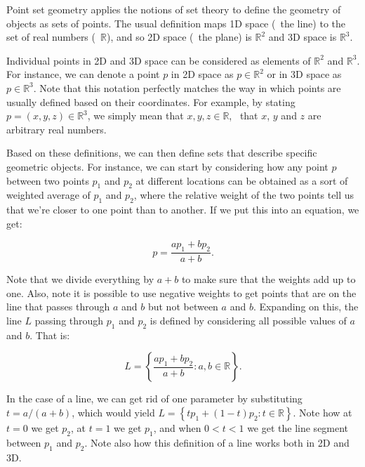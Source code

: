 Point set geometry applies the notions of set theory to define the geometry of objects as sets of points.
The usual definition maps 1D space (\ie\ the line) to the set of real numbers (\ie\ \(\mathbb{R}\)), and so 2D space (\ie\ the plane) is \(\mathbb{R}^2\) and 3D space is \(\mathbb{R}^3\).

Individual points in 2D and 3D space can be considered as elements of \(\mathbb{R}^2\) and \(\mathbb{R}^3\).
For instance, we can denote a point \(p\) in 2D space as \(p \in \mathbb{R}^2\) or in 3D space as \(p \in \mathbb{R}^3\).
Note that this notation perfectly matches the way in which points are usually defined based on their coordinates.
For example, by stating \(p = (x, y, z) \in \mathbb{R}^3\), we simply mean that \(x,y,z \in \mathbb{R} \), \ie\ that \(x\), \(y\) and \(z\) are arbitrary real numbers.

Based on these definitions, we can then define sets that describe specific geometric objects.
For instance, we can start by considering how any point \(p\) between two points \(p_1\) and \(p_2\) at different locations can be obtained as a sort of weighted average of \(p_1\) and \(p_2\), where the relative weight of the two points tell us that we're closer to one point than to another.
If we put this into an equation, we get:

\begin{equation}
p = \frac{a p_1 + b p_2}{a+b}.
\end{equation}

Note that we divide everything by \(a+b\) to make sure that the weights add up to one.
Also, note it is possible to use negative weights to get points that are on the line that passes through \(a\) and \(b\) but not between \(a\) and \(b\).
Expanding on this, the line \(L\) passing through \(p_1\) and \(p_2\) is defined by considering all possible values of \(a\) and \(b\).
That is:

\begin{equation}
\label{eq:line}
L = \left\{ \frac{a p_1 + b p_2}{a+b} : a,b \in \mathbb{R} \right\}.
\end{equation}

In the case of a line, we can get rid of one parameter by substituting \(t = a/(a+b)\), which would yield \(L = \left\{ t p_1 + (1-t) p_2 : t \in \mathbb{R} \right\} \).
Note how at \(t = 0\) we get \(p_2\), at \(t = 1\) we get \(p_1\), and when \(0 < t < 1\) we get the line segment between \(p_1\) and \(p_2\).
Note also how this definition of a line works both in 2D and 3D.

